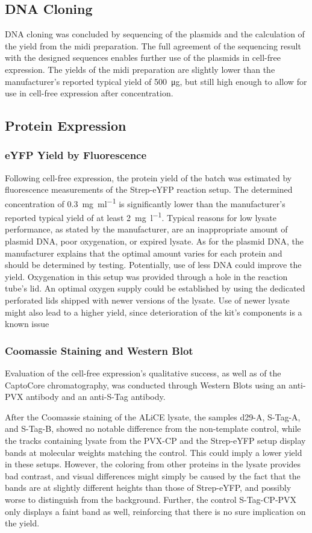 \subsection{DNA Cloning}
DNA cloning was concluded by sequencing of the plasmids and the calculation of the yield from the midi preparation. The full agreement of the sequencing result with the designed sequences enables further use of the plasmids in cell-free expression. The yields of the midi preparation are slightly lower than the manufacturer's reported typical yield of \SI{500}{\micro\gram}, but still high enough to allow for use in cell-free expression after concentration. 

\subsection{Protein Expression}
\subsubsection{eYFP Yield by Fluorescence}
Following cell-free expression, the protein yield of the batch was estimated by fluorescence measurements of the Strep-eYFP reaction setup. The determined concentration of \SI{0.3}{\milli\gram\per\milli\litre} is significantly lower than the manufacturer's reported typical yield of at least \SI{2}{\milli\gram\per\litre}. Typical reasons for low lysate performance, as stated by the manufacturer, are an inappropriate amount of plasmid DNA, poor oxygenation, or expired lysate. As for the plasmid DNA, the manufacturer explains that the optimal amount varies for each protein and should be determined by testing. Potentially, use of less DNA could improve the yield. Oxygenation in this setup was provided through a hole in the reaction tube's lid. An optimal oxygen supply could be established by using the dedicated perforated lids shipped with newer versions of the lysate. Use of newer lysate might also lead to a higher yield, since deterioration of the kit's components is a known issue 

\subsubsection{Coomassie Staining and Western Blot}
Evaluation of the cell-free expression's qualitative success, as well as of the CaptoCore chromatography, was conducted through Western Blots using an anti-PVX antibody and an anti-S-Tag antibody.

After the Coomassie staining of the ALiCE lysate, the samples d29-A, S-Tag-A, and S-Tag-B, showed no notable difference from the non-template control, while the tracks containing lysate from the PVX-CP and the Strep-eYFP setup display bands at molecular weights matching the control. This could imply a lower yield in these setups. However, the coloring from other proteins in the lysate provides bad contrast, and visual differences might simply be caused by the fact that the bands are at slightly different heights than those of Strep-eYFP, and possibly worse to distinguish from the background. Further, the control S-Tag-CP-PVX only displays a faint band as well, reinforcing that there is no sure implication on the yield. 

